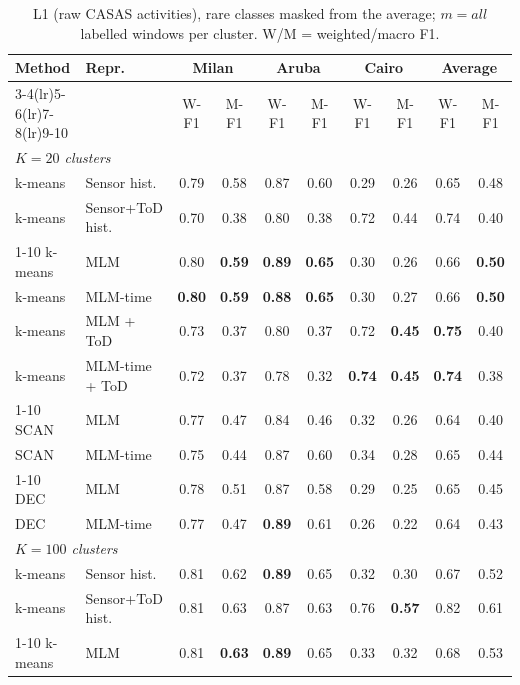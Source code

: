 \begin{table}[t]
\centering\small
\caption{L1 (raw CASAS activities), rare classes masked from the average; $m=all$ labelled windows per cluster. W/M = weighted/macro F1.}
\label{tab:l1_masked_mall}
\setlength{\tabcolsep}{4pt}
\begin{tabular}{llcccccc|cc}
\toprule
Method & Repr. & \multicolumn{2}{c}{Milan} & \multicolumn{2}{c}{Aruba} & \multicolumn{2}{c}{Cairo} & \multicolumn{2}{c}{Average} \\
\cmidrule(lr){3-4}\cmidrule(lr){5-6}\cmidrule(lr){7-8}\cmidrule(lr){9-10}
 & & W-F1 & M-F1 & W-F1 & M-F1 & W-F1 & M-F1 & W-F1 & M-F1 \\
\midrule
\multicolumn{10}{l}{\textit{$K = 20$ clusters}} \\
\midrule
k-means & Sensor hist. & 0.79 & 0.58 & 0.87 & 0.60 & 0.29 & 0.26 & 0.65 & 0.48 \\
k-means & Sensor+ToD hist. & 0.70 & 0.38 & 0.80 & 0.38 & 0.72 & 0.44 & 0.74 & 0.40 \\
\cmidrule{1-10}
k-means & MLM & 0.80 & \textbf{0.59} & \textbf{0.89} & \textbf{0.65} & 0.30 & 0.26 & 0.66 & \textbf{0.50} \\
k-means & MLM-time & \textbf{0.80} & \textbf{0.59} & \textbf{0.88} & \textbf{0.65} & 0.30 & 0.27 & 0.66 & \textbf{0.50} \\
k-means & MLM + ToD & 0.73 & 0.37 & 0.80 & 0.37 & 0.72 & \textbf{0.45} & \textbf{0.75} & 0.40 \\
k-means & MLM-time + ToD & 0.72 & 0.37 & 0.78 & 0.32 & \textbf{0.74} & \textbf{0.45} & \textbf{0.74} & 0.38 \\
\cmidrule{1-10}
SCAN & MLM & 0.77 & 0.47 & 0.84 & 0.46 & 0.32 & 0.26 & 0.64 & 0.40 \\
SCAN & MLM-time & 0.75 & 0.44 & 0.87 & 0.60 & 0.34 & 0.28 & 0.65 & 0.44 \\
\cmidrule{1-10}
DEC & MLM & 0.78 & 0.51 & 0.87 & 0.58 & 0.29 & 0.25 & 0.65 & 0.45 \\
DEC & MLM-time & 0.77 & 0.47 & \textbf{0.89} & 0.61 & 0.26 & 0.22 & 0.64 & 0.43 \\
\midrule
\multicolumn{10}{l}{\textit{$K = 100$ clusters}} \\
\midrule
k-means & Sensor hist. & 0.81 & 0.62 & \textbf{0.89} & 0.65 & 0.32 & 0.30 & 0.67 & 0.52 \\
k-means & Sensor+ToD hist. & 0.81 & 0.63 & 0.87 & 0.63 & 0.76 & \textbf{0.57} & 0.82 & 0.61 \\
\cmidrule{1-10}
k-means & MLM & 0.81 & \textbf{0.63} & \textbf{0.89} & 0.65 & 0.33 & 0.32 & 0.68 & 0.53 \\

\end{tabular}
\end{table}
